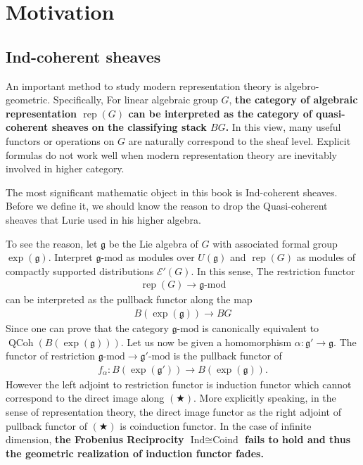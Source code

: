 {\begingroup

\newcommand{\rep}{\operatorname{rep}}
\newcommand{\icoh}{\operatorname{IndCoh}}
\newcommand{\qcoh}{\operatorname{QCoh}}
\newcommand{\coh}{\operatorname{Coh}}
\newcommand{\sch}{\operatorname{Sch}}
\newcommand{\op}{\operatorname{op}}
\newcommand{\dmod}{\operatorname{D-mod}}
\newcommand{\g}{\mathfrak{g}}
\newcommand{\ug}{U(\mathfrak{g})}
\newcommand{\gmod}{\mathfrak{g}\text{-mod}}
\newcommand{\dr}{\text{dR}}
\newcommand{\spec}{\operatorname{Spec}}

\chapter{Motivation}

\section{Ind-coherent sheaves}
An important method to study modern representation theory is algebro-geometric. Specifically,
For linear algebraic group $G$, \textbf{\color{blue} the category of algebraic representation $\rep(G)$ can be interpreted as 
the category of quasi-coherent sheaves on the classifying stack $BG$.} In this view, many useful functors or operations on $G$ are naturally
correspond to the sheaf level. Explicit formulas do not work well when modern representation theory are inevitably involved in higher category.

The most significant mathematic object in this book is Ind-coherent sheaves. Before we define it, we should know the reason to drop 
the Quasi-coherent sheaves that Lurie used in his higher algebra. 

To see the reason, let $\g$ be the Lie algebra of $G$ with associated formal group $\exp(\g)$.   
Interpret $\gmod$ as modules over $\ug$ and $\rep(G)$ as modules of compactly supported distributions $\mathcal{E}'(G)$.
In this sense, The restriction functor 
\begin{align*}
    \rep(G) \to \gmod
\end{align*}
can be interpreted as the pullback functor along the map
\begin{align*}
    B(\exp(\g)) \to BG
\end{align*}
Since one can prove that the category $\gmod$ is canonically equivalent to $\qcoh(B(\exp(\g)))$. 
Let us now be given a homomorphism $\alpha:\g'\to\g$. The functor of restriction $\gmod\to\mathfrak{g}'\text{-mod}$ is the pullback functor of 
\begin{align*}
    f_\alpha:B(\exp(\g')) \to B(\exp(\g)). \tag{$\bigstar$}
\end{align*}
However the left adjoint to restriction functor is induction functor which cannot correspond to the direct image along $(\bigstar)$.
More explicitly speaking, in the sense of representation theory, the direct image functor as the right adjoint of pullback functor of $(\bigstar)$ is coinduction functor.
In the case of infinite dimension, \textbf{\color{blue}the Frobenius Reciprocity $\text{Ind}\cong\text{Coind}$ fails to hold and thus the geometric realization of induction functor fades.}


}
